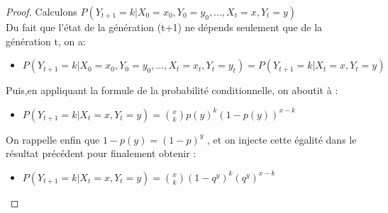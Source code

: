 \begin{proof}
Calculons $P(Y_{t+1} = k | X_0 = x_0, Y_0 = y_0, ..., X_t = x, Y_t = y)$\\
Du fait que l'état de la génération (t+1) ne dépends seulement que de la génération t, on a:
	\begin{itemize}[label=$\bullet$]
	\item $P(Y_{t+1} = k | X_0 = x_0, Y_0 = y_0, ..., X_t = x_t, Y_t = y_t) = P(Y_{t+1} = k | X_t = x, Y_t = y)$
	\end{itemize}
Puis,en appliquant la formule de la probabilité conditionnelle, on aboutit à :
	\begin{itemize}[label=$\bullet$]
	\item  $P(Y_{t+1} = k | X_t = x, Y_t = y)=\binom{x}{k}p(y)^{k} (1-p(y))^{x-k}$
	\end{itemize}
On rappelle enfin que $1-p(y) = (1-p)^{y}$ , et on injecte cette égalité dans le résultat précédent pour finalement obtenir :
	\begin{itemize}[label=$\bullet$]
	\item $P(Y_{t+1} = k | X_t = x, Y_t = y)= \binom{x}{k}(1 - q^{y})^{k}(q^{y})^{x - k}$
	\end{itemize}	
\end{proof}






